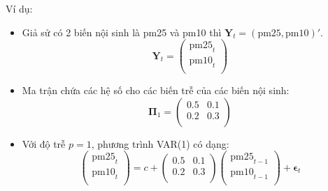 Ví dụ:
\begin{itemize}
    \item Giả sử có 2 biến nội sinh là pm25 và pm10 thì $\mathbf{Y}_t = (\text{pm25}, \text{pm10})'$. 
    \[
    \mathbf{Y}_t = \begin{pmatrix}
    \text{pm25}_t \\
    \text{pm10}_t \\
    \end{pmatrix}
    \]
    \item Ma trận chứa các hệ số cho các biến trễ của các biến nội sinh:
    \[
    \mathbf{\Pi}_1 = \begin{pmatrix}
    0.5 & 0.1 \\
    0.2 & 0.3 \\
    \end{pmatrix}
    \]
    \item Với độ trễ $p=1$, phương trình VAR(1) có dạng:
    \[
    \begin{pmatrix}
    \text{pm25}_t \\
    \text{pm10}_t \\
    \end{pmatrix} = c + \begin{pmatrix}
    0.5 & 0.1 \\
    0.2 & 0.3 \\
    \end{pmatrix} \begin{pmatrix}
    \text{pm25}_{t-1} \\
    \text{pm10}_{t-1} \\
    \end{pmatrix} + \mathbf{\epsilon}_t
    \]
\end{itemize}